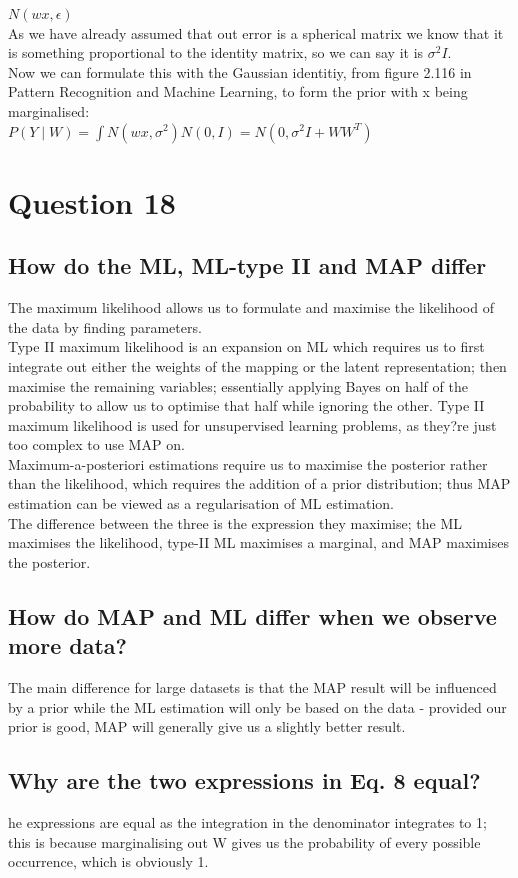\documentclass[a4paper, 9pt]{article}
\begin{document}
\( N (wx, \epsilon) \) \\

As we have already assumed that out error is a spherical matrix we know that it is something proportional to the identity matrix, so we can say it is \( \sigma^2 I \). \\
Now we can formulate this with the Gaussian identitiy, from figure 2.116 in Pattern Recognition and Machine Learning, to form the prior with x being marginalised: \\

\( P(Y \mid W) = \int N(wx, \sigma^2) N(0, I) = N(0, \sigma^2 I + WW^T) \) 

\section*{Question 18}
\subsection*{How do the ML, ML-type II and MAP differ}
The maximum likelihood allows us to formulate and maximise the likelihood of the data by finding parameters. \\
Type II maximum likelihood is an expansion on ML which requires us to first integrate out either the weights of the mapping or the latent representation; then maximise the remaining variables; essentially applying Bayes on half of the probability to allow us to optimise that half while ignoring the other. Type II maximum likelihood is used for unsupervised learning problems, as they?re just too complex to use MAP on. \\
Maximum-a-posteriori estimations require us to maximise the posterior rather than the likelihood, which requires the addition of a prior distribution; thus MAP estimation can be viewed as a regularisation of ML estimation. \\
The difference between the three is the expression they maximise; the ML maximises the likelihood, type-II ML maximises a marginal, and MAP maximises the posterior. 
\subsection*{How do MAP and ML differ when we observe more data?}
The main difference for large datasets is that the MAP result will be influenced by a prior while the ML estimation will only be based on the data - provided our prior is good, MAP will generally give us a slightly better result. 
\subsection*{Why are the two expressions in Eq. 8 equal?}
he expressions are equal as the integration in the denominator integrates to 1; this is because marginalising out W gives us the probability of every possible occurrence, which is obviously 1.
\end{document}
